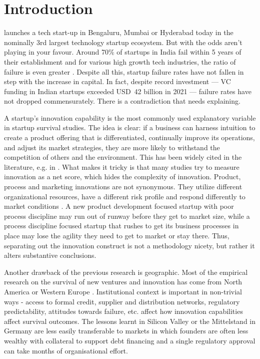 \documentclass{ieeeaccess}
\begin{document}
\section{Introduction}
\label{sec:introduction}

 launches a tech start-up in Bengaluru, Mumbai or Hyderabad today in the nominally 3rd largest technology startup ecosystem. But with the odds aren't playing in your favour. Around 70\% of startups in India fail within 5 years of their establishment and for various high growth tech industries, the ratio of failure is even greater \cite{b1}. Despite all this, startup failure rates have not fallen in step with the increase in capital. In fact, despite record investment — VC funding in Indian startups exceeded USD~42 billion in 2021 — failure rates have not dropped commensurately. There is a contradiction that needs explaining.

A startup's innovation capability is the most commonly used explanatory variable in startup survival studies. The idea is clear: if a business can harness intuition to create a product offering that is differentiated, continually improve its operations, and adjust its market strategies, they are more likely to withstand the competition of others and the environment. This has been widely cited in the literature, e.g. in \cite{b4, b5}. What makes it tricky is that many studies try to measure innovation as a net score, which hides the complexity of innovation. Product, process and marketing innovations are not synonymous. They utilize different organizational resources, have a different risk profile and respond differently to market conditions \cite{b6}. A new product development focused startup with poor process discipline may run out of runway before they get to market size, while a process discipline focused startup that rushes to get its business processes in place may lose the agility they need to get to market or stay there. Thus, separating out the innovation construct is not a methodology nicety, but rather it alters substantive conclusions.

Another drawback of the previous research is geographic. Most of the empirical research on the survival of new ventures and innovation has come from North America or Western Europe \cite{b7}. Institutional context is important in non-trivial ways - access to formal credit, supplier and distribution networks, regulatory predictability, attitudes towards failure, etc. affect how innovation capabilities affect survival outcomes. The lessons learnt in Silicon Valley or the Mittelstand in Germany are less easily transferable to markets in which founders are often less wealthy with collateral to support debt financing and a single regulatory approval can take months of organisational effort.
\end{document}
